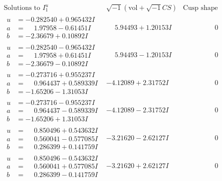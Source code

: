 \documentclass[1p]{elsarticle_modified}
\theoremstyle{definition}
\newcommand{\I}{\sqrt{-1}}
\begin{document}
$$\begin{array}{c|c|c}  
\text{Solutions to }I^u_{1}& \I (\text{vol} + \sqrt{-1}CS) & \text{Cusp shape}\\
 \hline 
\begin{aligned}
u &= -0.282540 + 0.965432 I \\
a &= \phantom{-}1.97958 - 0.61451 I \\
b &= -2.36679 + 0.10892 I\end{aligned}
 & \phantom{-}5.94493 + 1.20153 I & \phantom{-0.000000 } 0 \\ \hline\begin{aligned}
u &= -0.282540 - 0.965432 I \\
a &= \phantom{-}1.97958 + 0.61451 I \\
b &= -2.36679 - 0.10892 I\end{aligned}
 & \phantom{-}5.94493 - 1.20153 I & \phantom{-0.000000 } 0 \\ \hline\begin{aligned}
u &= -0.273716 + 0.955237 I \\
a &= \phantom{-}0.964437 + 0.589339 I \\
b &= -1.65206 - 1.31053 I\end{aligned}
 & -4.12089 + 2.31752 I & \phantom{-0.000000 } 0 \\ \hline\begin{aligned}
u &= -0.273716 - 0.955237 I \\
a &= \phantom{-}0.964437 - 0.589339 I \\
b &= -1.65206 + 1.31053 I\end{aligned}
 & -4.12089 - 2.31752 I & \phantom{-0.000000 } 0 \\ \hline\begin{aligned}
u &= \phantom{-}0.850496 + 0.543632 I \\
a &= \phantom{-}0.560041 - 0.577085 I \\
b &= \phantom{-}0.286399 + 0.141759 I\end{aligned}
 & -3.21620 - 2.62127 I & \phantom{-0.000000 } 0 \\ \hline\begin{aligned}
u &= \phantom{-}0.850496 - 0.543632 I \\
a &= \phantom{-}0.560041 + 0.577085 I \\
b &= \phantom{-}0.286399 - 0.141759 I\end{aligned}
 & -3.21620 + 2.62127 I & \phantom{-0.000000 } 0 \\ \hline\begin{aligned}

\end{aligned}
\end{array}$$
\end{document}
